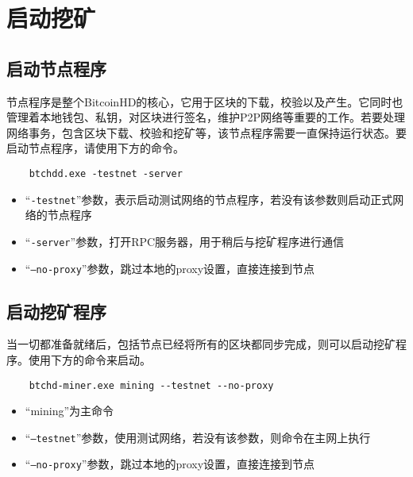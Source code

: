 \section{启动挖矿}
\subsection{启动节点程序}
\begin{flushleft}
    节点程序是整个BitcoinHD的核心，它用于区块的下载，校验以及产生。它同时也管理着本地钱包、私钥，对区块进行签名，维护P2P网络等重要的工作。若要处理网络事务，包含区块下载、校验和挖矿等，该节点程序需要一直保持运行状态。要启动节点程序，请使用下方的命令。
\end{flushleft}
\scriptsize
\begin{verbatim}
    btchdd.exe -testnet -server
\end{verbatim}
\normalsize
\begin{itemize}
    \item ``\texttt{-testnet}''参数，表示启动测试网络的节点程序，若没有该参数则启动正式网络的节点程序
    \item ``\texttt{-server}''参数，打开RPC服务器，用于稍后与挖矿程序进行通信
    \item ``\texttt{--no-proxy}''参数，跳过本地的proxy设置，直接连接到节点
\end{itemize}
\subsection{启动挖矿程序}
\begin{flushleft}
    当一切都准备就绪后，包括节点已经将所有的区块都同步完成，则可以启动挖矿程序。使用下方的命令来启动。
\end{flushleft}
\scriptsize
\begin{verbatim}
    btchd-miner.exe mining --testnet --no-proxy
\end{verbatim}
\normalsize
\begin{itemize}
    \item ``mining''为主命令
    \item ``\texttt{--testnet}''参数，使用测试网络，若没有该参数，则命令在主网上执行
    \item ``\texttt{--no-proxy}''参数，跳过本地的proxy设置，直接连接到节点
\end{itemize}
